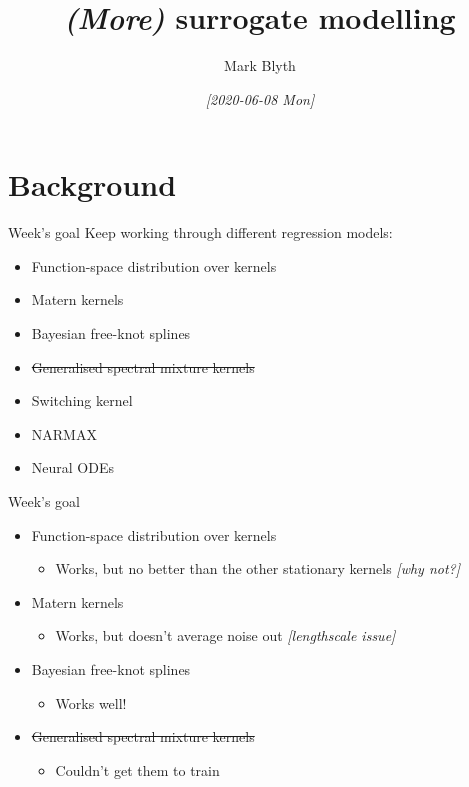\documentclass[presentation]{beamer}
\author{Mark Blyth}
\date{\textit{[2020-06-08 Mon]}}
\title{\emph{(More)} surrogate modelling}
\begin{document}
\maketitle

\section{Background}
\label{sec:org93cc080}
\begin{frame}[label={sec:orgd32cb8d}]{Week's goal}
Keep working through different regression models:
\vfill
\begin{itemize}
\item \alert{Function-space distribution over kernels}
\item \alert{Matern kernels}
\item \alert{Bayesian free-knot splines}
\item \sout{Generalised spectral mixture kernels}
\item Switching kernel
\item NARMAX
\item Neural ODEs
\end{itemize}
\end{frame}

\begin{frame}[label={sec:org38bd3d8}]{Week's goal}
\begin{itemize}
\item \alert{Function-space distribution over kernels}
\begin{itemize}
\item Works, but no better than the other stationary kernels \emph{[why not?]}
\end{itemize}
\item \alert{Matern kernels}
\begin{itemize}
\item Works, but doesn't average noise out \emph{[lengthscale issue]}
\end{itemize}
\item \alert{Bayesian free-knot splines}
\begin{itemize}
\item Works well!
\end{itemize}
\item \sout{Generalised spectral mixture kernels}
\begin{itemize}
\item Couldn't get them to train
\end{itemize}
\end{itemize}
\end{frame}
\end{document}
